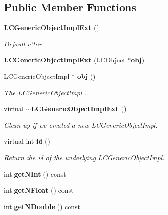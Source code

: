 \subsection*{Public Member Functions}
\begin{DoxyCompactItemize}
\item 
{\bf L\-C\-Generic\-Object\-Impl\-Ext} ()\label{classCALICE_1_1LCGenericObjectImplExt_aa3a6bb969c7cc736d88587960b663cba}

\begin{DoxyCompactList}\small\item\em Default c'tor. \end{DoxyCompactList}\item 
{\bfseries L\-C\-Generic\-Object\-Impl\-Ext} (L\-C\-Object $\ast${\bf obj})\label{classCALICE_1_1LCGenericObjectImplExt_a5e58ebbd98f49efeee560fd6bda8aae4}

\item 
L\-C\-Generic\-Object\-Impl $\ast$ {\bf obj} ()
\begin{DoxyCompactList}\small\item\em The L\-C\-Generic\-Object\-Impl . \end{DoxyCompactList}\item 
virtual {\bf $\sim$\-L\-C\-Generic\-Object\-Impl\-Ext} ()\label{classCALICE_1_1LCGenericObjectImplExt_a6326844158718441a0e984402e9c2f8b}

\begin{DoxyCompactList}\small\item\em Clean up if we created a new L\-C\-Generic\-Object\-Impl. \end{DoxyCompactList}\item 
virtual int {\bf id} ()\label{classCALICE_1_1LCGenericObjectImplExt_a13e336bf7a902820651dadb79271cd37}

\begin{DoxyCompactList}\small\item\em Return the id of the underlying L\-C\-Generic\-Object\-Impl. \end{DoxyCompactList}\item 
int {\bfseries get\-N\-Int} () const \label{classCALICE_1_1LCGenericObjectImplExt_aee1c6e2485d45b6dcba643210f840224}

\item 
int {\bfseries get\-N\-Float} () const \label{classCALICE_1_1LCGenericObjectImplExt_a09d41f70b6a4894b0f79806c32ead2b3}

\item 
int {\bfseries get\-N\-Double} () const \label{classCALICE_1_1LCGenericObjectImplExt_aa8503a0fc8e66c4e0e374e32bb594231}


\end{DoxyCompactItemize}
